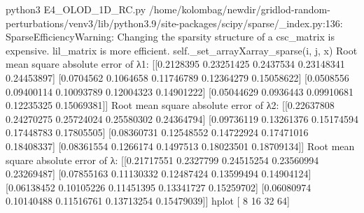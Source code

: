 python3 E4_OLOD_1D_RC.py
/home/kolombag/newdir/gridlod-random-perturbations/venv3/lib/python3.9/site-packages/scipy/sparse/_index.py:136: SparseEfficiencyWarning: Changing the sparsity structure of a csc_matrix is expensive. lil_matrix is more efficient.
  self._set_arrayXarray_sparse(i, j, x)
Root mean square absolute error of λ1:
 [[0.2128395  0.23251425 0.2437534  0.23148341 0.24453897]
 [0.0704562  0.1064658  0.11746789 0.12364279 0.15058622]
 [0.0508556  0.09400114 0.10093789 0.12004323 0.14901222]
 [0.05044629 0.0936443  0.09910681 0.12235325 0.15069381]]
Root mean square absolute error of λ2: 
 [[0.22637808 0.24270275 0.25724024 0.25580302 0.24364794]
 [0.09736119 0.13261376 0.15174594 0.17448783 0.17805505]
 [0.08360731 0.12548552 0.14722924 0.17471016 0.18408337]
 [0.08361554 0.1266174  0.1497513  0.18023501 0.18709134]]
Root mean square absolute error of λ: 
 [[0.21717551 0.2327799  0.24515254 0.23560994 0.23269487]
 [0.07855163 0.11130332 0.12487424 0.13599494 0.14904124]
 [0.06138452 0.10105226 0.11451395 0.13341727 0.15259702]
 [0.06080974 0.10140488 0.11516761 0.13713254 0.15479039]]
hplot [ 8 16 32 64]